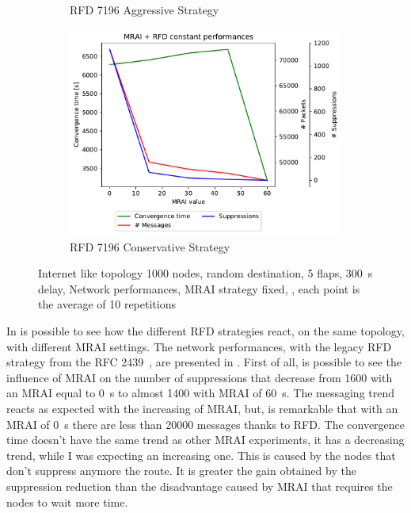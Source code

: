 \begin{figure}[h]
\begin{subfigure}[b]{0.49\textwidth}
         \caption{RFD 7196 Aggressive Strategy}
         \label{fig:1000_7196RFDA_multiMRAI_mice}
     \end{subfigure}
     \begin{subfigure}[b]{0.49\textwidth}
         \centering
         \includegraphics[width=\textwidth]{images/RFD/miceVSelephants/MultiMRAI/mice/cisco_1000_RFD_7196_conservative-constant_mrai_rfd_evolution.pdf}
         \caption{RFD 7196 Conservative Strategy}
         \label{fig:1000_7196RFDC_multiMRAI_mice}
     \end{subfigure}
		\caption{Internet like topology \num{1000} nodes, random destination,
		\num{5} flaps, \SI{300}{\second} delay, Network performances, \ac{MRAI}
		strategy fixed, , each point is the average of
		\num{10} repetitions}
        \label{fig:1000_RFD_multiMRAI_mice}
\end{figure}


In  is possible to see how the different \ac{RFD} strategies
react, on the same topology, with different \ac{MRAI} settings.
The network performances, with the legacy \ac{RFD} strategy from the \ac{RFC}
\num{2439}~\cite{rfc2439}, are presented in .
First of all, is possible to see the influence of \ac{MRAI} on the number of suppressions
that decrease from \num{1600} with an \ac{MRAI} equal to \SI{0}{\second} to almost
\num{1400} with \ac{MRAI} of \SI{60}{\second}.
The messaging trend reacts as expected with the increasing of
\ac{MRAI}, but, is remarkable that with an \ac{MRAI} of \SI{0}{\second} there
are less than \num{20000} messages thanks to \ac{RFD}.
The convergence time doesn't have the same trend as other \ac{MRAI} experiments,
it has a decreasing trend, while I was expecting an increasing one.
This is caused by the nodes that don't suppress anymore the route.
It is greater the gain obtained by the suppression reduction than the disadvantage
caused by \ac{MRAI} that requires the nodes to wait more time.

